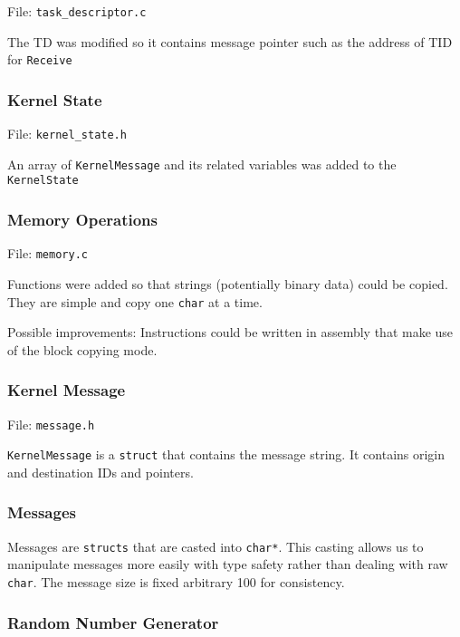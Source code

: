 \documentclass[letterpaper, 12pt]{article}
\begin{document}
File: \texttt{task\_descriptor.c}

The TD was modified so it contains message pointer such as the address of TID for \texttt{Receive}


\subsubsection{Kernel State%
  \label{kernel-state}%
}

File: \texttt{kernel\_state.h}

An array of \texttt{KernelMessage} and its related variables was added to the \texttt{KernelState}


\subsubsection{Memory Operations%
  \label{memory-operations}%
}

File: \texttt{memory.c}

Functions were added so that strings (potentially binary data) could be copied. They are simple and copy one \texttt{char} at a time.

Possible improvements: Instructions could be written in assembly that make use of the block copying mode.


\subsubsection{Kernel Message%
  \label{kernel-message}%
}

File: \texttt{message.h}

\texttt{KernelMessage} is a \texttt{struct} that contains the message string. It contains origin and destination IDs and pointers.


\subsubsection{Messages%
  \label{messages}%
}

Messages are \texttt{structs} that are casted into \texttt{char*}. This casting allows us to manipulate messages more easily with type safety rather than dealing with raw \texttt{char}. The message size is fixed arbitrary 100 for consistency.


\subsubsection{Random Number Generator%
  \label{random-number-generator}%
}
\end{document}
